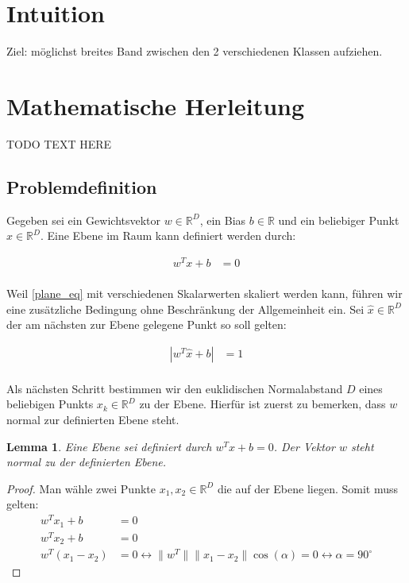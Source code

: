 \documentclass[a4paper,11pt,twoside]{scrreprt}
\newtheorem{lemma}[theorem]{Lemma}
\newcommand{\norm}[1]{\lVert#1\rVert}
\begin{document}
\section{Intuition}
Ziel: möglichst breites Band zwischen den 2 verschiedenen Klassen aufziehen.

\section{Mathematische Herleitung}

TODO TEXT HERE
\subsection{Problemdefinition}
Gegeben sei ein Gewichtsvektor $w \in \mathbb{R}^{D}$, ein Bias $b \in \mathbb{R}$ und ein beliebiger Punkt $x \in \mathbb{R}^{D}$. Eine Ebene im Raum kann definiert werden durch:

\begin{equation} \label{plane_eq}
    \begin{aligned}
    w^{T} x + b &= 0 \\
    \end{aligned}
\end{equation}

Weil \autoref{plane_eq} mit verschiedenen Skalarwerten skaliert werden kann, führen wir eine zusätzliche Bedingung ohne Beschränkung der Allgemeinheit ein. Sei $\hat{x} \in \mathbb{R}^{D}$ der am nächsten zur Ebene gelegene Punkt so soll gelten:

\begin{equation} \label{plane_normalization}
	\begin{aligned}
		|w^{T} \hat{x} + b| &= 1 \\
	\end{aligned}
\end{equation}

Als nächsten Schritt bestimmen wir den euklidischen Normalabstand $D$ eines beliebigen Punkts $x_{k} \in \mathbb{R}^{D}$ zu der Ebene. Hierfür ist zuerst zu bemerken, dass $w$ normal zur definierten Ebene steht.

\begin{lemma}
	Eine Ebene sei definiert durch $w^{T} x + b = 0$. Der Vektor $w$ steht normal zu der definierten Ebene.
\end{lemma}

\begin{proof}
	Man wähle zwei Punkte $x_{1}, x_{2} \in \mathbb{R}^{D}$ die auf der Ebene liegen. Somit muss gelten:
	\begin{equation}
		\begin{aligned}
			w^{T} x_{1} + b &= 0 \\
			w^{T} x_{2} + b &= 0 \\
			w^{T} (x_{1} - x_{2}) &= 0 \leftrightarrow \norm{w^{T}} \norm{x_{1} - x_{2}} \cos(\alpha) = 0 \leftrightarrow \alpha = 90^{\circ}
		\end{aligned}
	\end{equation}
\end{proof}
\end{document}
